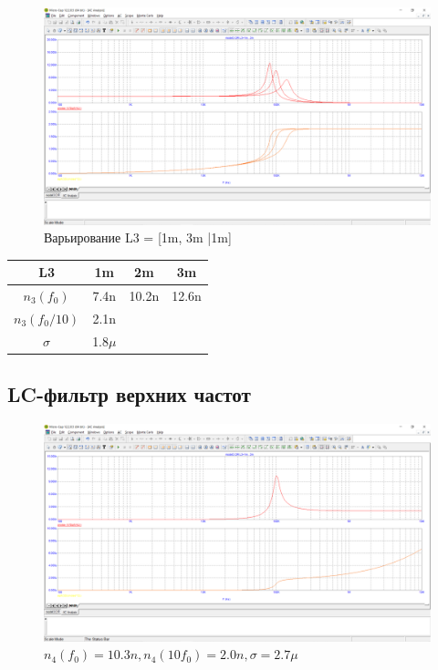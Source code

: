 \documentclass[a4paper, 12pt]{article}%
\begin{document}
\begin{figure}[h!]
    \centering
    \includegraphics[scale = 0.4 \textwidth]{images/mod3_3_2_3.png}
    \caption{Варьирование L3 = [1m, 3m |1m]}
    \label{fig:m3323}
\end{figure}

\begin{tabular}{|c|c|c|c|}
    L3 & 1m & 2m & 3m\\ \hline
    $n_3(f_0)$ & 7.4n & 10.2n & 12.6n\\ \hline
    $n_3(f_0/10)$ & 2.1n &  & \\ \hline
    $\sigma$ & 1.8$\mu$ &  & \\ \hline
\end{tabular}

\subsection{LC-фильтр верхних частот}

\begin{figure}[h!]
    \centering
    \includegraphics[scale = 0.4 \textwidth]{images/mod3_4_1.png}
    \caption{$n_4(f_0) = 10.3n, n_4(10 f_0) = 2.0n, \sigma = 2.7\mu$}
    \label{fig:m341}
\end{figure}
\end{document}
